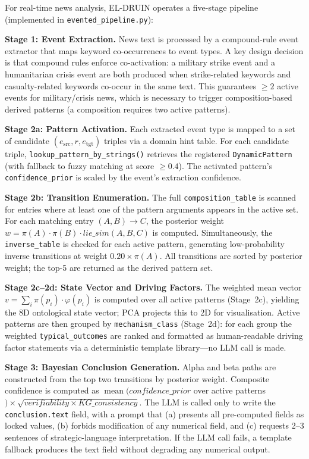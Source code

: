 \documentclass{llncs}
\begin{document}
For real-time news analysis, EL-DRUIN operates a five-stage pipeline
(implemented in \texttt{evented\_pipeline.py}):

\textbf{Stage 1: Event Extraction.}
News text is processed by a compound-rule event extractor that maps
keyword co-occurrences to event types. A key design decision is that
compound rules enforce co-activation: a military strike event and a
humanitarian crisis event are both produced when strike-related keywords
and casualty-related keywords co-occur in the same text. This guarantees
$\geq\!2$ active events for military/crisis news, which is necessary to
trigger composition-based derived patterns (a composition requires two
active patterns).

\textbf{Stage 2a: Pattern Activation.}
Each extracted event type is mapped to a set of candidate
$(e_{\mathrm{src}}, r, e_{\mathrm{tgt}})$ triples via a domain hint
table. For each candidate triple, \texttt{lookup\_pattern\_by\_strings()}
retrieves the registered \texttt{DynamicPattern} (with fallback to fuzzy
matching at score $\geq 0.4$). The activated pattern's
\texttt{confidence\_prior} is scaled by the event's extraction confidence.

\textbf{Stage 2b: Transition Enumeration.}
The full \texttt{composition\_table} is scanned for entries where at least
one of the pattern arguments appears in the active set. For each
matching entry $(A, B) \to C$, the posterior weight
$w = \pi(A) \cdot \pi(B) \cdot \mathit{lie\_sim}(A, B, C)$ is computed.
Simultaneously, the \texttt{inverse\_table} is checked for each active
pattern, generating low-probability inverse transitions at weight
$0.20 \times \pi(A)$. All transitions are sorted by posterior weight;
the top-5 are returned as the derived pattern set.

\textbf{Stage 2c--2d: State Vector and Driving Factors.}
The weighted mean vector $v = \sum_i \pi(p_i) \cdot \varphi(p_i)$ is computed over
all active patterns (Stage~2c), yielding the 8D ontological state vector; PCA projects
this to 2D for visualisation. Active patterns are then grouped by \texttt{mechanism\_class}
(Stage~2d): for each group the weighted \texttt{typical\_outcomes} are ranked and
formatted as human-readable driving factor statements via a deterministic template
library---no LLM call is made.

\textbf{Stage 3: Bayesian Conclusion Generation.}
Alpha and beta paths are constructed from the top two transitions by
posterior weight. Composite confidence is computed as
$\operatorname{mean}(\mathit{confidence\_prior}$ over active patterns$)
\times \sqrt{\mathit{verifiability} \times \mathit{KG\_consistency}}$.
The LLM is called only to write the \texttt{conclusion.text} field, with a
prompt that (a) presents all pre-computed fields as locked values,
(b) forbids modification of any numerical field, and (c) requests 2--3
sentences of strategic-language interpretation. If the LLM call fails,
a template fallback produces the text field without degrading any
numerical output.
\end{document}
